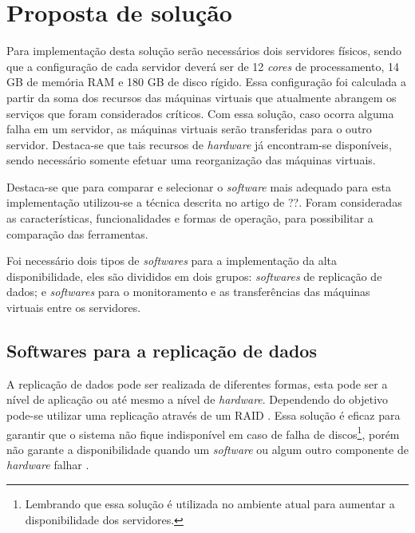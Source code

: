 \section{Proposta de solução}
\label{section:propostasolucao}

Para implementação desta solução serão necessários dois servidores físicos, sendo que a configuração de cada servidor deverá ser de 
12 \textit{cores} de processamento, 14 GB de memória \ac{RAM} e 180 GB de disco rígido. Essa configuração foi calculada a partir da soma dos 
recursos das máquinas virtuais que atualmente abrangem os serviços que foram considerados críticos. Com essa solução, caso ocorra alguma falha 
em um servidor, as máquinas virtuais serão transferidas para o outro servidor. Destaca-se que tais recursos de \textit{hardware} já 
encontram-se disponíveis, sendo necessário somente efetuar uma reorganização das máquinas virtuais.

Destaca-se que para comparar e selecionar o \textit{software} mais adequado para esta implementação utilizou-se a técnica descrita no artigo 
de ??. %
Foram consideradas as características, funcionalidades e formas de operação, para possibilitar a comparação das ferramentas.

Foi necessário dois tipos de \textit{softwares} para a implementação da alta disponibilidade, eles são divididos em dois grupos: 
\textit{softwares} de replicação de dados; e \textit{softwares} para o monitoramento e as transferências das máquinas virtuais entre os servidores.

\subsection{Softwares para a replicação de dados}
\label{section:toolrepl}

A replicação de dados pode ser realizada de diferentes formas, esta pode ser a nível de aplicação ou até mesmo a nível de \textit{hardware}.
Dependendo do objetivo pode-se utilizar uma replicação através de um \ac{RAID} \cite{tanenbaum2009sistemas}. Essa solução é eficaz para garantir 
que o sistema não fique indisponível em caso de falha de discos\footnote[1]{Lembrando que essa solução é utilizada no ambiente atual para 
aumentar a disponibilidade dos servidores.}, porém não garante a disponibilidade quando um \textit{software} ou algum outro componente de 
\textit{hardware} falhar \cite{zaminhani2008}.

